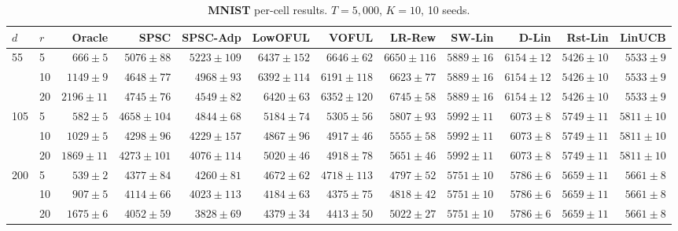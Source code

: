 \begin{table}[!htbp]
\centering
\caption{\textbf{MNIST} per-cell results. $T{=}5{,}000$, $K{=}10$, 10 seeds.}
\label{tab:app-mnist}
\scriptsize
\setlength{\tabcolsep}{3pt}
\begin{tabular}{llrrrrrrrrrr}
\toprule
$d$ & $r$ & Oracle & \textbf{SPSC} & \textbf{SPSC-Adp} & LowOFUL & VOFUL & LR-Rew & SW-Lin & D-Lin & Rst-Lin & LinUCB \\
\midrule
55 & 5 & $666{\pm}5$ & \cellcolor{green!12}$5076{\pm}88$ & \cellcolor{green!12}$5223{\pm}109$ & $6437{\pm}152$ & $6646{\pm}62$ & $6650{\pm}116$ & $5889{\pm}16$ & $6154{\pm}12$ & \underline{$5426{\pm}10$} & $5533{\pm}9$ \\
 & 10 & $1149{\pm}9$ & \cellcolor{green!12}$4648{\pm}77$ & \cellcolor{green!12}$4968{\pm}93$ & $6392{\pm}114$ & $6191{\pm}118$ & $6623{\pm}77$ & $5889{\pm}16$ & $6154{\pm}12$ & \underline{$5426{\pm}10$} & $5533{\pm}9$ \\
 & 20 & $2196{\pm}11$ & \cellcolor{green!12}$4745{\pm}76$ & \cellcolor{green!12}$4549{\pm}82$ & $6420{\pm}63$ & $6352{\pm}120$ & $6745{\pm}58$ & $5889{\pm}16$ & $6154{\pm}12$ & \underline{$5426{\pm}10$} & $5533{\pm}9$ \\
105 & 5 & $582{\pm}5$ & \cellcolor{green!12}$4658{\pm}104$ & \cellcolor{green!12}$4844{\pm}68$ & \underline{$5184{\pm}74$} & $5305{\pm}56$ & $5807{\pm}93$ & $5992{\pm}11$ & $6073{\pm}8$ & $5749{\pm}11$ & $5811{\pm}10$ \\
 & 10 & $1029{\pm}5$ & \cellcolor{green!12}$4298{\pm}96$ & \cellcolor{green!12}$4229{\pm}157$ & \underline{$4867{\pm}96$} & $4917{\pm}46$ & $5555{\pm}58$ & $5992{\pm}11$ & $6073{\pm}8$ & $5749{\pm}11$ & $5811{\pm}10$ \\
 & 20 & $1869{\pm}11$ & \cellcolor{green!12}$4273{\pm}101$ & \cellcolor{green!12}$4076{\pm}114$ & $5020{\pm}46$ & \underline{$4918{\pm}78$} & $5651{\pm}46$ & $5992{\pm}11$ & $6073{\pm}8$ & $5749{\pm}11$ & $5811{\pm}10$ \\
200 & 5 & $539{\pm}2$ & \cellcolor{green!12}$4377{\pm}84$ & \cellcolor{green!12}$4260{\pm}81$ & \underline{$4672{\pm}62$} & $4718{\pm}113$ & $4797{\pm}52$ & $5751{\pm}10$ & $5786{\pm}6$ & $5659{\pm}11$ & $5661{\pm}8$ \\
 & 10 & $907{\pm}5$ & \cellcolor{green!12}$4114{\pm}66$ & \cellcolor{green!12}$4023{\pm}113$ & \underline{$4184{\pm}63$} & $4375{\pm}75$ & $4818{\pm}42$ & $5751{\pm}10$ & $5786{\pm}6$ & $5659{\pm}11$ & $5661{\pm}8$ \\
 & 20 & $1675{\pm}6$ & \cellcolor{green!12}$4052{\pm}59$ & \cellcolor{green!12}$3828{\pm}69$ & \underline{$4379{\pm}34$} & $4413{\pm}50$ & $5022{\pm}27$ & $5751{\pm}10$ & $5786{\pm}6$ & $5659{\pm}11$ & $5661{\pm}8$ \\
\bottomrule
\end{tabular}
\end{table}

